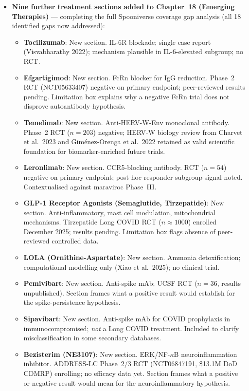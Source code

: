 \begin{itemize}
  \item \textbf{Nine further treatment sections added to Chapter~18 (Emerging Therapies)} --- completing the full Spooniverse coverage gap analysis (all 18 identified gaps now addressed):
    \begin{itemize}
      \item \textbf{Tocilizumab}: New section. IL-6R blockade; single case report (Visvabharathy 2022);
        mechanism plausible in IL-6-elevated subgroup; no RCT. \cite{Visvabharathy2022tocilizumab}
      \item \textbf{Efgartigimod}: New section. FcRn blocker for IgG reduction. Phase~2 RCT
        (NCT05633407) negative on primary endpoint; peer-reviewed results pending.
        Limitation box explains why a negative FcRn trial does not disprove autoantibody hypothesis.
      \item \textbf{Temelimab}: New section. Anti-HERV-W-Env monoclonal antibody. Phase~2 RCT
        ($n=203$) negative; HERV-W biology review from Charvet et al.\ 2023 and Giménez-Orenga et al.\
        2022 retained as valid scientific foundation for biomarker-enriched future trials.
        \cite{Charvet2023HERV, GimenezOrenga2022HERV}
      \item \textbf{Leronlimab}: New section. CCR5-blocking antibody. RCT ($n=54$) negative on
        primary endpoint; post-hoc responder subgroup signal noted. Contextualised against maraviroc
        Phase~III. \cite{Gaylis2022leronlimab}
      \item \textbf{GLP-1 Receptor Agonists (Semaglutide, Tirzepatide)}: New section.
        Anti-inflammatory, mast cell modulation, mitochondrial mechanisms. Tirzepatide Long COVID
        RCT ($n\approx1000$) enrolled December 2025; results pending. Limitation box flags absence of
        peer-reviewed controlled data.
      \item \textbf{LOLA (Ornithine-Aspartate)}: New section. Ammonia detoxification; computational
        modelling only (Xiao et al.\ 2025); no clinical trial.
      \item \textbf{Pemivibart}: New section. Anti-spike mAb; UCSF RCT ($n=36$, results unpublished).
        Section frames what a positive result would establish for the spike-persistence hypothesis.
      \item \textbf{Sipavibart}: New section. Anti-spike mAb for COVID prophylaxis in
        immunocompromised; \emph{not} a Long COVID treatment. Included to clarify misclassification
        in some secondary databases.
      \item \textbf{Bezisterim (NE3107)}: New section. ERK/NF-$\kappa$B neuroinflammation inhibitor.
        ADDRESS-LC Phase~2/3 RCT (NCT06847191, \$13.1M DoD CDMRP) enrolling; no efficacy data yet.
        Section frames what a positive or negative result would mean for the neuroinflammatory
        hypothesis.
    \end{itemize}


\end{itemize}
